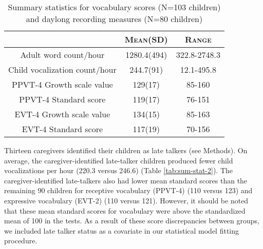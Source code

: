 \documentclass[a4paper,man,natbib,donotrepeattitle, apacite]{apa6}
\begin{document}
\begin{table}
\centering
\caption{\label{tab:sum-stat}Summary statistics for vocabulary scores (N=103 children) and 
daylong recording measures (N=80 children)}

\begin{tabular}{c | c | c } 
\hline
 & \textsc{Mean(SD)} & \textsc{Range} \\
\hline
\midrule

Adult word count/hour & 1280.4(494) & 322.8-2748.3 \\
Child vocalization count/hour & 244.7(91) & 12.1-495.8 \\
PPVT-4 Growth scale value & 129(17) & 85-160 \\
PPVT-4 Standard score & 119(17) & 76-151 \\
EVT-4 Growth scale value & 134(15) & 85-163 \\
EVT-4 Standard score & 117(19) & 70-156 \\


\bottomrule
\end{tabular}
\end{table}


Thirteen caregivers identified their children as late talkers (see Methods). On average, the caregiver-identified late-talker children produced fewer child vocalizations per hour (220.3 versus 246.6) (Table \ref{tab:sum-stat-2}). The caregiver-identified late-talkers also had lower mean standard scores than the remaining 90 children for receptive vocabulary (PPVT-4) (110 versus 123) and expressive vocabulary (EVT-2) (110 versus 121). However, it should be noted that these mean standard scores for vocabulary were above the standardized mean of 100 in the tests. As a result of these score discrepancies between groups, we included late talker status as a covariate in our statistical model fitting procedure.
\end{document}
